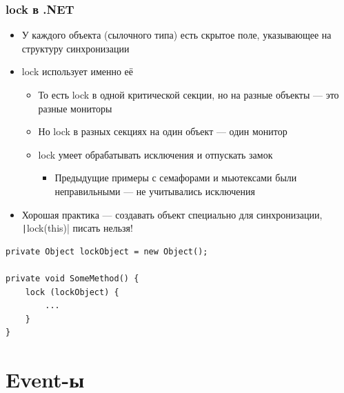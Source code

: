 \documentclass[xetex,mathserif,serif]{beamer}
\begin{document}
    \begin{frame}[fragile]
        \frametitle{lock в .NET}
        \begin{itemize}
            \item У каждого объекта (сылочного типа) есть скрытое поле, указывающее на структуру синхронизации
            \item lock использует именно её
            \begin{itemize}
                \item То есть lock в одной критической секции, но на разные объекты --- это разные мониторы
                \item Но lock в разных секциях на один объект --- один монитор
                \item lock умеет обрабатывать исключения и отпускать замок
                \begin{itemize}
                    \item Предыдущие примеры с семафорами и мьютексами были неправильными --- не учитывались исключения
                \end{itemize}
            \end{itemize}
            \item Хорошая практика --- создавать объект специально для синхронизации, \texttt|lock(this)| писать нельзя!
        \end{itemize}
        \begin{footnotesize}
            \begin{verbatim}
private Object lockObject = new Object();

private void SomeMethod() {
    lock (lockObject) {
        ...
    }
}
            \end{verbatim}
        \end{footnotesize}
    \end{frame}

    \section{Event-ы}
\end{document}

